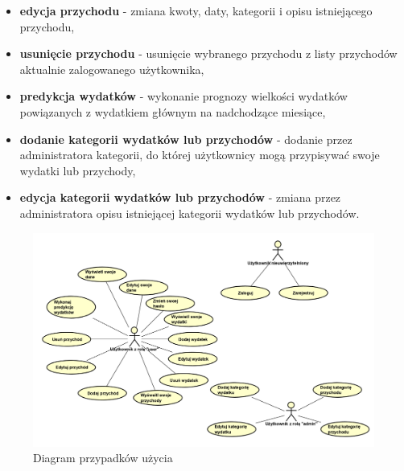 \begin{itemize}
	\item\textbf{edycja przychodu} - zmiana kwoty, daty, kategorii i opisu istniejącego przychodu,
	\item\textbf{usunięcie przychodu} - usunięcie wybranego przychodu z listy przychodów aktualnie zalogowanego użytkownika,
	\item\textbf{predykcja wydatków} - wykonanie prognozy wielkości wydatków powiązanych z wydatkiem głównym na nadchodzące miesiące,
	\item\textbf{dodanie kategorii wydatków lub przychodów} - dodanie przez administratora kategorii, do której użytkownicy mogą przypisywać swoje wydatki lub przychody,
	\item\textbf{edycja kategorii wydatków lub przychodów} - zmiana przez administratora opisu istniejącej kategorii wydatków lub przychodów.
\end{itemize}
\begin{figure}[!ht]
	\begin{center}
		\includegraphics[width=6in]{img/diagram/use_cases.png}
		\caption{Diagram przypadków użycia}
		\label{usecases}
	\end{center}
\end{figure}
